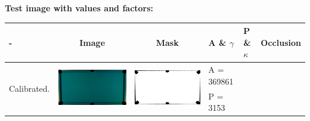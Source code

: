 \textbf{Test image with values and factors:}\\
\begin{tabular}{|l|c|c|l|l|c|}
\hline - & Image & Mask & A \& $\gamma$ & P \& $\kappa$ & Occlusion \\ 
\hline

\multirow{2}{*}{Calibrated.} & \multirow{2}{*}{\includegraphics[scale=0.05]{../images/1/calibimg.png}} & \multirow{2}{*}{\includegraphics[scale=0.05]{../images/1/calibmask.png}} & A = 369861 &  & \multirow{2}{*}{}\\  
& & & P = 3153 & & \\
\hline


\end{tabular}
